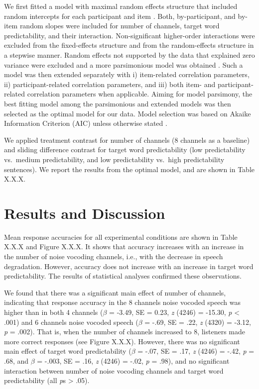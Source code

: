 \documentclass[a4paper, nobind]{templates/ociamthesis}
\begin{document}
We first fitted a model with maximal random effects structure that included random intercepts for each participant and item \autocite{Barr2013}.
Both, by-participant, and by-item random slopes were included for number of channels, target word predictability, and their interaction.
Non-significant higher-order interactions were excluded from the fixed-effects structure and from the random-effects structure in a stepwise manner.
Random effects not supported by the data that explained zero variance were excluded and a more parsimonious model was obtained \autocite{Bates2015a}.
Such a model was then extended separately with i) item-related correlation parameters, ii) participant-related correlation parameters, and iii) both item- and participant-related correlation parameters when applicable.
Aiming for model parsimony, the best fitting model among the parsimonious and extended models was then selected as the optimal model for our data. Model selection was based on Akaike Information Criterion (AIC) unless otherwise stated \autocite{Burnham2002,Grueber2011,Richards2011}.

We applied treatment contrast for number of channels (8 channels as a baseline) and sliding difference contrast for target word predictability (low predictability vs.~medium predictability, and low predictability vs.~high predictability sentences).
We report the results from the optimal model, and are shown in Table X.X.X.

\hypertarget{results-and-discussion}{%
\section{Results and Discussion}\label{results-and-discussion}}

Mean response accuracies for all experimental conditions are shown in Table X.X.X and Figure X.X.X.
It shows that accuracy increases with an increase in the number of noise vocoding channels, i.e., with the decrease in speech degradation.
However, accuracy does not increase with an increase in target word predictability.
The results of statistical analyses confirmed these observations.

We found that there was a significant main effect of number of channels, indicating that response accuracy in the 8 channels noise vocoded speech was higher than in both 4 channels (\(\beta\) = -3.49, SE = 0.23, \emph{z} (4246) = -15.30, \emph{p} \textless{} .001) and 6 channels noise vocoded speech (\(\beta\) = -.69, SE = .22, \emph{z} (4320) = -3.12, \emph{p} = .002).
That is, when the number of channels increased to 8, listeners made more correct responses (see Figure X.X.X).
However, there was no significant main effect of target word predictability (\(\beta\) = -.07, SE = .17, \emph{z} (4246) = -.42, \emph{p} = .68, and \(\beta\) = -.003, SE = .16, \emph{z} (4246) = -.02, \emph{p} = .98), and no significant interaction between number of noise vocoding channels and target word predictability (all \emph{p}s \textgreater{} .05).
\end{document}

